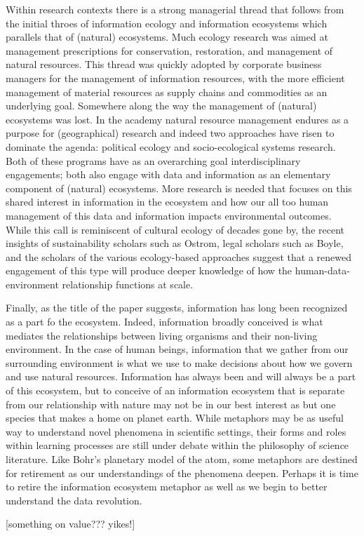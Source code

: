 Within research contexts there is a strong managerial thread that follows from the initial throes of information ecology and information ecosystems which parallels that of (natural) ecosystems. Much ecology research was aimed at management prescriptions for conservation, restoration, and management of natural resources. This thread was quickly adopted by corporate business managers for the management of information resources, with the more efficient management of material resources as supply chains and commodities as an underlying goal. Somewhere along the way the management of (natural) ecosystems was lost. In the academy natural resource management endures as a purpose for (geographical) research and indeed two approaches have risen to dominate the agenda: political ecology and socio-ecological systems research. Both of these programs have as an overarching goal interdisciplinary engagements; both also engage with data and information as an elementary component of (natural) ecosystems. More research is needed that focuses on this shared interest in information in the ecosystem and how our all too human management of this data and information impacts environmental outcomes. While this call is reminiscent of cultural ecology of decades gone by, the recent insights of sustainability scholars such as Ostrom, legal scholars such as Boyle, and the scholars of the various ecology-based approaches suggest that a renewed engagement of this type will produce deeper knowledge of how the human-data-environment relationship functions at scale.

Finally, as the title of the paper suggests, information has long been recognized as a part fo the ecosystem. Indeed, information broadly conceived is what mediates the relationships between living organisms and their non-living environment. In the case of human beings, information that we gather from our surrounding environment is what we use to make decisions about how we govern and use natural resources. Information has always been and will always be a part of this ecosystem, but to conceive of an information ecosystem that is separate from our relationship with nature may not be in our best interest as but one species that makes a home on planet earth. While metaphors may be as useful way to understand novel phenomena in scientific settings, their forms and roles within learning processes are still under debate within the philosophy of science literature. Like Bohr's planetary model of the atom, some metaphors are destined for retirement as our understandings of the phenomena deepen. Perhaps it is time to retire the information ecosystem metaphor as well as we begin to better understand the data revolution.

[something on value??? yikes!]